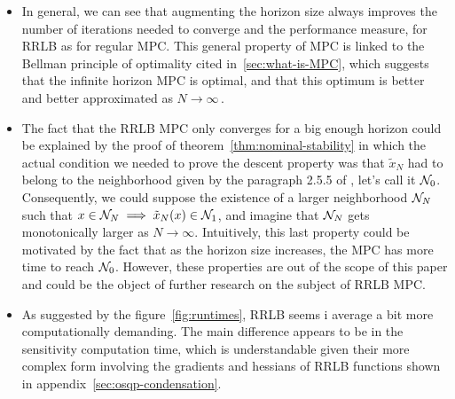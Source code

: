 \documentclass[12pt]{article}
\begin{document}
\begin{itemize}[label=\textbullet]
	\item In general, we can see that augmenting the horizon size always improves the number of iterations needed to converge and the performance measure, for RRLB as for regular MPC.
	This general property of MPC is linked to the Bellman principle of optimality cited in~\ref{sec:what-is-MPC}, which suggests that the infinite horizon MPC is optimal, and that this optimum is better and better approximated as $N\to\infty$\,.

	\item The fact that the RRLB MPC only converges for a big enough horizon could be explained by the proof of theorem~\ref{thm:nominal-stability} in which the actual condition we needed to prove the descent property was that $\tilde{x}_N$ had to belong to the neighborhood given by the paragraph 2.5.5 of \cite{MPC-book}, let's call it $\mathcal{N}_0$.
	Consequently, we could suppose the existence of a larger neighborhood $\mathcal{N}_N$ such that $x\in\mathcal{N}_N\implies \tilde{x}_N(x)\in\mathcal{N}_1$, and imagine that $\mathcal{N}_N$ gets monotonically larger as $N\to\infty$.
	Intuitively, this last property could be motivated by the fact that as the horizon size increases, the MPC has more time to reach $\mathcal{N}_0$.
	However, these properties are out of the scope of this paper and could be the object of further research on the subject of RRLB MPC.

	\item As suggested by the figure~\ref{fig:runtimes}, RRLB seems i average a bit more computationally demanding.
	The main difference appears to be in the sensitivity computation time, which is understandable given their more complex form involving the gradients and hessians of RRLB functions shown in appendix~\ref{sec:osqp-condensation}.


\end{itemize}
\end{document}
